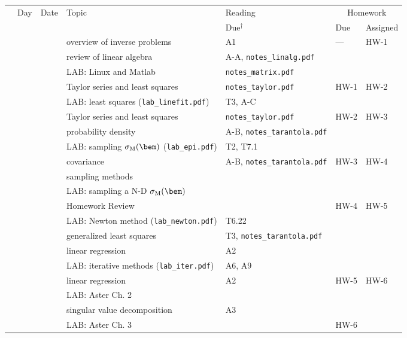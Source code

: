 \documentclass[10pt,titlepage,fleqn]{article}
\begin{document}
\begin{enumerate}
\hspace{-1.5cm}
\begin{tabular}{cll|l|l|ll}
\hline
  & Day & Date & Topic & Reading & \multicolumn{2}{c}{Homework} \\
  &     &      &       & Due$^\dagger$     & Due & Assigned \\ \hline\hline
  &   &  & overview of inverse problems & A1 & --- & HW-1 \\
\hline
  &   &  & review of linear algebra & A-A, \verb+notes_linalg.pdf+ & &  \\
  &   &  & LAB: Linux and Matlab & \verb+notes_matrix.pdf+ & & \\
\hline
  &   &  & Taylor series and least squares & \verb+notes_taylor.pdf+ & HW-1 & HW-2 \\
  &   &  & LAB: least squares (\verb+lab_linefit.pdf+) & T3, A-C & & \\
\hline
  &   &  & Taylor series and least squares & \verb+notes_taylor.pdf+ & HW-2 & HW-3 \\
  &   &  & probability density & A-B, \verb+notes_tarantola.pdf+ & & \\
  &   &  & LAB: sampling $\sigma_{\rm M}(\bem)$ (\verb+lab_epi.pdf+) & T2, T7.1 & & \\
\hline
  &   &  & covariance & A-B, \verb+notes_tarantola.pdf+ & HW-3 & HW-4 \\
  &   &  & sampling methods & & & \\
  &   &  & LAB: sampling a N-D $\sigma_{\rm M}(\bem)$ & & & \\
\hline
  &   &  & Homework Review &  & HW-4 & HW-5 \\
  &   &  & LAB: Newton method (\verb+lab_newton.pdf+) & T6.22 & & \\
\hline
  &   &  & generalized least squares & T3, \verb+notes_tarantola.pdf+ & & \\
  &   &  & linear regression & A2 & & \\
  &   &  & LAB: iterative methods (\verb+lab_iter.pdf+) & A6, A9 & & \\
\hline
  &   &  & linear regression & A2 & HW-5 & HW-6 \\
  &   &  & LAB: Aster Ch. 2 & & & \\
\hline
  &   &  & singular value decomposition & A3 & & \\
  &   &  & LAB: Aster Ch. 3 & & HW-6 & \\

\end{tabular}
\end{enumerate}
\end{document}
